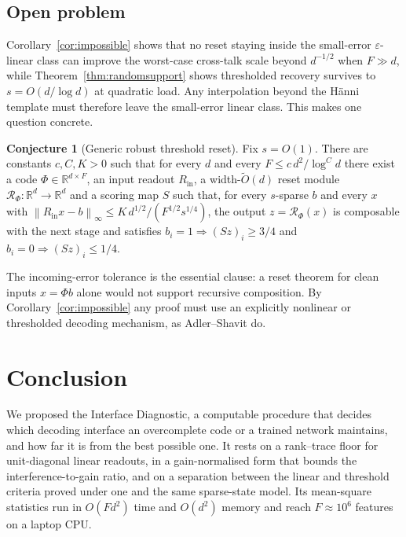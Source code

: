 \documentclass[preprint,12pt]{elsarticle}
\theoremstyle{definition}
\newtheorem{conjecture}[theorem]{Conjecture}
\newcommand{\Otilde}{\widetilde{O}}
\newcommand{\R}{\mathbb{R}}
\newcommand{\norm}[1]{\left\lVert #1 \right\rVert}
\begin{document}
\subsection{Open problem}
\label{sec:open}

Corollary~\ref{cor:impossible} shows that no reset staying inside the small-error
$\varepsilon$-linear class can improve the worst-case cross-talk scale beyond $d^{-1/2}$ when
$F\gg d$, while Theorem~\ref{thm:randomsupport} shows thresholded recovery survives to
$s=O(d/\log d)$ at quadratic load. Any interpolation beyond the H\"{a}nni template must
therefore leave the small-error linear class. This makes one question concrete.

\begin{conjecture}[Generic robust threshold reset]
\label{conj:reset}
Fix $s=O(1)$. There are constants $c,C,K>0$ such that for every $d$ and every
$F\le c\,d^2/\log^C d$ there exist a code $\Phi\in\R^{d\times F}$, an input readout
$R_{\mathrm{in}}$, a width-$\Otilde(d)$ reset module $\mathcal R_\Phi:\R^d\to\R^d$ and a
scoring map $S$ such that, for every $s$-sparse $b$ and every $x$ with
$\norm{R_{\mathrm{in}}x-b}_\infty\le K\,d^{1/2}/(F^{1/2}s^{1/4})$, the output
$z=\mathcal R_\Phi(x)$ is composable with the next stage and satisfies
$b_i=1\Rightarrow(Sz)_i\ge3/4$ and $b_i=0\Rightarrow(Sz)_i\le1/4$.
\end{conjecture}

The incoming-error tolerance is the essential clause: a reset theorem for clean inputs
$x=\Phi b$ alone would not support recursive composition. By
Corollary~\ref{cor:impossible} any proof must use an explicitly nonlinear or thresholded
decoding mechanism, as Adler--Shavit do.

\section{Conclusion}
\label{sec:conclusion}

We proposed the Interface Diagnostic, a computable procedure that decides which decoding
interface an overcomplete code or a trained network maintains, and how far it is from the best
possible one. It rests on a rank--trace floor for unit-diagonal linear readouts, in a
gain-normalised form that bounds the interference-to-gain ratio, and on a separation between the
linear and threshold criteria proved under one and the same sparse-state model. Its mean-square
statistics run in $O(Fd^2)$ time and $O(d^2)$ memory and reach $F\approx10^6$ features on a
laptop CPU.
\end{document}
